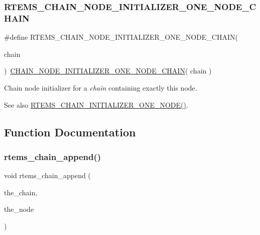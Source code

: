\subsubsection{\texorpdfstring{RTEMS\_CHAIN\_NODE\_INITIALIZER\_ONE\_NODE\_CHAIN}{RTEMS\_CHAIN\_NODE\_INITIALIZER\_ONE\_NODE\_CHAIN}}
{\footnotesize\ttfamily \#define R\+T\+E\+M\+S\+\_\+\+C\+H\+A\+I\+N\+\_\+\+N\+O\+D\+E\+\_\+\+I\+N\+I\+T\+I\+A\+L\+I\+Z\+E\+R\+\_\+\+O\+N\+E\+\_\+\+N\+O\+D\+E\+\_\+\+C\+H\+A\+IN(\begin{DoxyParamCaption}\item[{}]{chain }\end{DoxyParamCaption})~\mbox{\hyperlink{group__RTEMSScoreChain_ga1d87ba1964e8793cb2f399c7a36b0e06}{C\+H\+A\+I\+N\+\_\+\+N\+O\+D\+E\+\_\+\+I\+N\+I\+T\+I\+A\+L\+I\+Z\+E\+R\+\_\+\+O\+N\+E\+\_\+\+N\+O\+D\+E\+\_\+\+C\+H\+A\+IN}}( chain )}



Chain node initializer for a {\itshape chain} containing exactly this node. 

\begin{DoxySeeAlso}{See also}
\mbox{\hyperlink{group__ClassicChains_gaa05397b51bc03203b87a1946ba1e704a}{R\+T\+E\+M\+S\+\_\+\+C\+H\+A\+I\+N\+\_\+\+I\+N\+I\+T\+I\+A\+L\+I\+Z\+E\+R\+\_\+\+O\+N\+E\+\_\+\+N\+O\+D\+E()}}. 
\end{DoxySeeAlso}


\subsection{Function Documentation}
\mbox{\label{group__ClassicChains_ga946ee16c96fcf84a071a5bc951f1eaaa}} 
\subsubsection{\texorpdfstring{rtems\_chain\_append()}{rtems\_chain\_append()}}
{\footnotesize\ttfamily void rtems\+\_\+chain\+\_\+append (\begin{DoxyParamCaption}\item[{\mbox{\hyperlink{unionChain__Control}{rtems\+\_\+chain\+\_\+control}} $\ast$}]{the\+\_\+chain,  }\item[{\mbox{\hyperlink{structChain__Node__struct}{rtems\+\_\+chain\+\_\+node}} $\ast$}]{the\+\_\+node }\end{DoxyParamCaption})}



